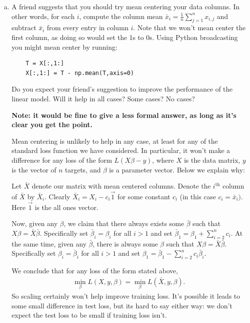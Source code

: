 \documentclass[10pt]{article}
\begin{document}
\begin{enumerate}[(a)]
	\item A friend suggests that you should try mean centering your data columns. In other words, for each $i$, compute the column mean $\bar{x}_i = \frac{1}{n}\sum_{j=1}^n x_{i,j}$ and subtract $\bar{x}_i$ from every entry in column $i$. Note that we won't mean center the first column, as doing so would set the 1s to 0s.
	Using Python broadcasting you might mean center by running:
	\begin{lstlisting}
	T = X[:,1:]
	X[:,1:] = T - np.mean(T,axis=0)
	\end{lstlisting}
	Do you expect your friend's suggestion to improve the performance of the linear model. Will it help in all cases? Some cases? No cases?
	
	\color{blue}
	\textbf{Note: it would be fine to give a less formal answer, as long as it's clear you get the point.}
	
	Mean centering is unlikely to help in any case, at least for any of the standard loss function we have considered. In particular, it won't make a difference for any loss of the form $L(X\beta - y)$, where $X$ is the data matrix, $y$ is the vector of $n$ targets, and $\beta$ is a parameter vector.  Below we explain why:
	
	Let $\bar{X}$ denote our matrix with mean centered columns. Denote the $i^\text{th}$ column of $\bar{X}$ by $\bar{X}_i$. Clearly $\bar{X}_i = X_i - c_i \vec{1}$ for some constant $c_i$ (in this case $c_i = \bar{x}_i)$. Here $\vec{1}$ is the all ones vector. 
	
	Now, given any $\beta$, we claim that there always exists some $\bar{\beta}$ such that $X\beta = \bar{X}\bar{\beta}$. Specifically set $\bar{\beta}_i = {\beta}_i$ for all $i > 1$ and set $\bar{\beta}_1 = \beta_1 + \sum_{i=2}^n c_i$. At the same time, given any  $\bar{\beta}$, there is always some $\beta$ such that $X\beta = \bar{X}\bar{\beta}$. Specifically set ${\beta}_i = \bar{\beta}_i$ for all $i > 1$ and set ${\beta}_1 = \bar{\beta}_1 - \sum_{i=2}^n c_i\bar{\beta}_i$.
	
	We conclude that for any loss of the form stated above, 
	\begin{align*}
	\min_\beta L(X,y,\beta) = 	\min_\beta L(\bar{X},y,\beta).
	\end{align*}
	So scaling certainly won't help improve training loss. It's possible it leads to some small difference in test loss, but its hard to say either way: we don't expect the test loss to be small if training loss isn't. 
	\color{black}
	

\end{enumerate}
\end{document}
